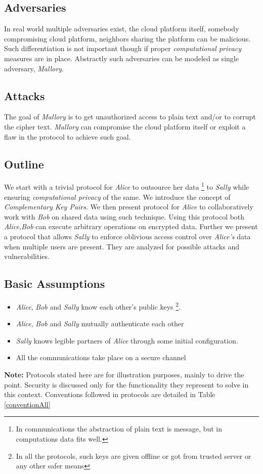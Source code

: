 \documentclass[conference]{IEEEtran}
\numberwithin{equation}{section}
\begin{document}
  \subsection{Adversaries}
 In real world multiple adversaries exist, the cloud platform itself, somebody compromising cloud platform, neighbors sharing the platform can be malicious. Such differentiation is not important though if proper \emph{computational privacy} measures are in place. Abstractly such adversaries can be modeled as  single adversary, \emph{Mallory}. 
 \subsection{Attacks} The goal of \emph{Mallory} is to get unauthorized access to plain text and/or to corrupt the cipher text. \emph{Mallory} can compromise the cloud platform itself or exploit a flaw in the protocol to achieve such goal.
\subsection{Outline}
We start with a trivial protocol for \emph{Alice} to outsource her data \footnote{In communications the abstraction of plain text is message, but in computations data fits well.} to \emph{Sally}  while ensuring \emph{computational privacy}  of the same. We introduce the concept of \emph{Complementary Key Pairs}. We then present protocol for \emph{Alice} to collaboratively work with \emph{Bob} on shared data using such technique. Using this protocol both \emph{Alice,Bob} can execute arbitrary operations on encrypted data. Further we present a protocol that allows \emph{Sally} to enforce oblivious access control over \emph{Alice's} data when multiple users are present. They are analyzed for possible attacks and vulnerabilities.
\subsection{Basic Assumptions}
\begin{itemize}
\item \emph{Alice}, \emph{Bob} and \emph{Sally}  know each other's public keys \footnote{In all the protocols, such keys are given offline or got from trusted server or any other safer means}.
\item \emph{Alice}, \emph{Bob} and \emph{Sally} mutually authenticate each other
\item \emph{Sally} knows legible partners of \emph{Alice} through some initial configuration.
\item All the communications take place on a secure channel
\end{itemize}
 {\bf Note:} Protocols stated here are for illustration purposes, mainly to drive the point. Security is discussed only for the functionality they represent to solve in this context. Conventions followed in protocols are detailed in Table \ref{conventionAll}
\end{document}
